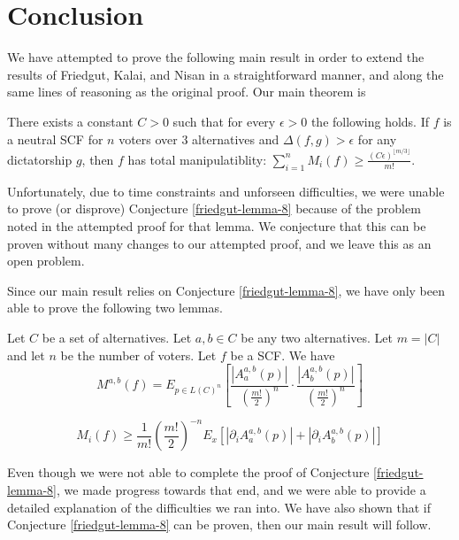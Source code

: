 
\chapter{Conclusion}

	We have attempted to prove the following main result in order to extend the results of Friedgut, Kalai, and Nisan in a straightforward manner, and along the same lines of reasoning as the original proof. Our main theorem is

	\begin{conjecture}
		There exists a constant $C > 0$ such that for every $\epsilon > 0$ the following holds. If $f$ is a neutral SCF for $n$ voters over 3 alternatives and $\Delta(f, g) > \epsilon$ for any dictatorship $g$, then $f$ has total manipulatiblity: $\sum^n_{i=1} M_i(f) \ge \frac{(C\epsilon)^{\lfloor m/3 \rfloor}}{m!}$.
	\end{conjecture}

	Unfortunately, due to time constraints and unforseen difficulties, we were unable to prove (or disprove) Conjecture \ref{friedgut-lemma-8} because of the problem noted in the attempted proof for that lemma. We conjecture that this can be proven without many changes to our attempted proof, and we leave this as an open problem.

	Since our main result relies on Conjecture \ref{friedgut-lemma-8}, we have only been able to prove the following two lemmas.

	\begin{lemma}
		Let $C$ be a set of alternatives. Let $a, b \in C$ be any two alternatives. Let $m = |C|$ and let $n$ be the number of voters. Let $f$ be a SCF. We have
		\[
			M^{a,b}(f) = E_{p \in L(C)^n} \left[ \frac{|A^{a,b}_a(p)|}{\left(\frac{m!}{2}\right)^n} \cdot \frac{|A^{a,b}_b(p)|}{\left(\frac{m!}{2}\right)^n} \right]
		\]
	\end{lemma}

	\begin{lemma}
		\[
			M_i(f) \ge \frac{1}{m!} \left(\frac{m!}{2}\right)^{-n} E_x \left[|\partial_i A^{a,b}_a(p)| + |\partial_i A^{a,b}_b(p)| \right]
		\]
	\end{lemma}

	Even though we were not able to complete the proof of Conjecture \ref{friedgut-lemma-8}, we made progress towards that end, and we were able to provide a detailed explanation of the difficulties we ran into. We have also shown that if Conjecture \ref{friedgut-lemma-8} can be proven, then our main result will follow.

